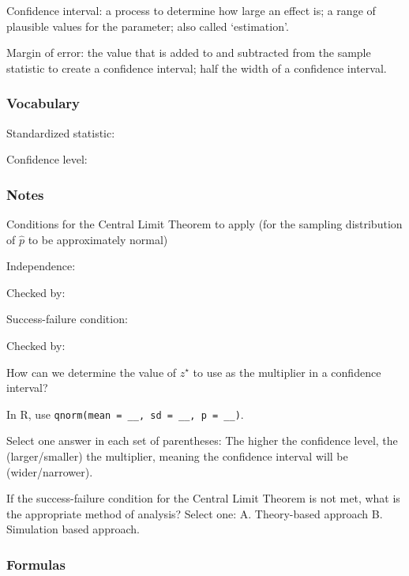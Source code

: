 \documentclass[
]{report}
\newcommand{\rgs}{\vspace{12pt}} %
\newcommand{\rgi}{\hspace{24pt}}  %
\begin{document}
Confidence interval: a process to determine how large an effect is; a range of plausible values for the parameter; also called `estimation'.

Margin of error: the value that is added to and subtracted from the sample statistic to create a confidence interval; half the width of a confidence interval.

\hypertarget{vocabulary-13}{%
\subsubsection*{Vocabulary}\label{vocabulary-13}}

Standardized statistic:
\rgs

Confidence level:
\rgs

\hypertarget{notes-16}{%
\subsubsection*{Notes}\label{notes-16}}

Conditions for the Central Limit Theorem to apply (for the sampling distribution of \(\hat{p}\) to be approximately normal)

\rgi Independence:
\rgs

\rgi \rgi Checked by:
\rgs

\rgi Success-failure condition:
\rgs

\rgi \rgi Checked by:
\rgs

How can we determine the value of \(z^⋆\) to use as the multiplier in a confidence interval?
\rgs

\rgi In R, use \texttt{qnorm(mean\ =\ \_\_,\ sd\ =\ \_\_,\ p\ =\ \_\_)}.

Select one answer in each set of parentheses: The higher the confidence level, the (larger/smaller) the multiplier, meaning the confidence interval will be (wider/narrower).

If the success-failure condition for the Central Limit Theorem is not met, what is the appropriate method of analysis? Select one:
\rgi A. Theory-based approach
\rgi B. Simulation based approach.

\hypertarget{formulas-2}{%
\subsubsection*{Formulas}\label{formulas-2}}
\end{document}
